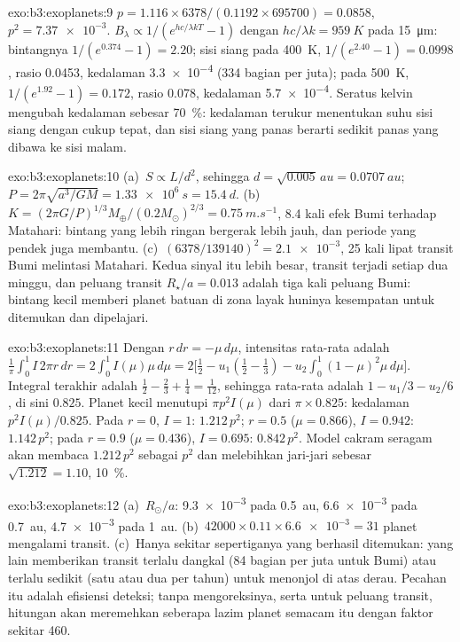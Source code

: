 \begin{solution}{exo:b3:exoplanets:9}
$p = 1.116\times6378/(0.1192\times695700) = 0.0858$, $p^2 = \num{7.37e-3}$.
$B_\lambda \propto 1/(e^{hc/\lambda kT} - 1)$ dengan $hc/\lambda k =
\qty{959}{K}$ pada \qty{15}{\micro m}: bintangnya $1/(e^{0.374} - 1) = 2.20$;
sisi siang pada \qty{400}{K}, $1/(e^{2.40} - 1) = 0.0998$, rasio \num{0.0453},
kedalaman \num{3.3e-4} (334 bagian per juta); pada \qty{500}{K}, $1/(e^{1.92} -
1) = 0.172$, rasio \num{0.078}, kedalaman \num{5.7e-4}. Seratus kelvin
mengubah kedalaman sebesar \qty{70}{\percent}: kedalaman terukur menentukan
suhu sisi siang dengan cukup tepat, dan sisi siang yang panas berarti sedikit
panas yang dibawa ke sisi malam.
\end{solution}

\begin{solution}{exo:b3:exoplanets:10}
(a)~$S \propto L/d^2$, sehingga $d = \sqrt{0.005}\,\unit{au} = \qty{0.0707}{au}$;
$P = 2\pi\sqrt{a^3/GM} = \qty{1.33e6}{s} = \qty{15.4}{d}$.
(b)~$K = (2\pi G/P)^{1/3}M_\oplus/(0.2M_\odot)^{2/3} = \qty{0.75}{m.s^{-1}}$,
8.4 kali efek Bumi terhadap Matahari: bintang yang lebih ringan bergerak lebih jauh, dan
periode yang pendek juga membantu. (c)~$(6378/139140)^2 = \num{2.1e-3}$, 25 kali lipat
transit Bumi melintasi Matahari. Kedua sinyal itu lebih besar, transit
terjadi setiap dua minggu, dan peluang transit $R_\star/a =
\num{0.013}$ adalah tiga kali peluang Bumi: bintang kecil memberi planet batuan di
zona layak huninya kesempatan untuk ditemukan dan dipelajari.
\end{solution}

\begin{solution}{exo:b3:exoplanets:11}
Dengan $r\,dr = -\mu\,d\mu$, intensitas rata-rata adalah $\frac1\pi\int_0^1
I\,2\pi r\,dr = 2\int_0^1 I(\mu)\mu\,d\mu = 2\bigl[\tfrac12 - u_1(\tfrac12 -
\tfrac13) - u_2\int_0^1(1 - \mu)^2\mu\,d\mu\bigr]$. Integral terakhir adalah
$\tfrac12 - \tfrac23 + \tfrac14 = \tfrac1{12}$, sehingga rata-rata adalah $1 - u_1/3 -
u_2/6$, di sini $0.825$. Planet kecil menutupi $\pi p^2 I(\mu)$ dari $\pi\times
0.825$: kedalaman $p^2 I(\mu)/0.825$. Pada $r = 0$, $I = 1$: $1.212\,p^2$;
$r = 0.5$ ($\mu = 0.866$), $I = 0.942$: $1.142\,p^2$; pada $r = 0.9$ ($\mu =
0.436$), $I = 0.695$: $0.842\,p^2$. Model cakram seragam akan membaca
$1.212\,p^2$ sebagai $p^2$ dan melebihkan jari-jari sebesar $\sqrt{1.212} = 1.10$,
\qty{10}{\percent}.
\end{solution}

\begin{solution}{exo:b3:exoplanets:12}
(a)~$R_\odot/a$: \num{9.3e-3} pada \qty{0.5}{au}, \num{6.6e-3} pada
\qty{0.7}{au}, \num{4.7e-3} pada \qty{1}{au}. (b)~$42000\times0.11\times
\num{6.6e-3} = 31$ planet mengalami transit. (c)~Hanya sekitar sepertiganya yang
berhasil ditemukan: yang lain memberikan transit terlalu dangkal (84 bagian per juta untuk
Bumi) atau terlalu sedikit (satu atau dua per tahun) untuk menonjol di atas derau. Pecahan
itu adalah efisiensi deteksi; tanpa mengoreksinya, serta untuk
peluang transit, hitungan akan meremehkan seberapa lazim
planet semacam itu dengan faktor sekitar 460.
\end{solution}

